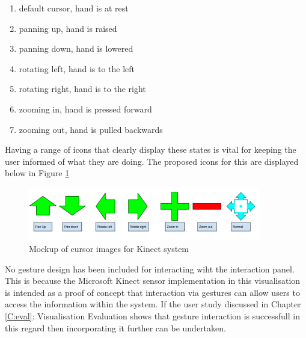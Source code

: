 \begin{enumerate}
\begin{enumerate}
 \item default cursor, hand is at rest
 \item panning up, hand is raised
 \item panning down, hand is lowered
 \item rotating left, hand is to the left
 \item rotating right, hand is to the right
 \item zooming in, hand is pressed forward
 \item zooming out, hand is pulled backwards
\end{enumerate}
Having a range of icons that clearly display these states is vital for keeping
the user informed of what they are doing. The proposed icons for this are displayed below in Figure \ref{fig:cursors}
\begin{figure}[H]
  \centering
      \includegraphics[width=0.9\textwidth]{images/curserImages.png}
  \caption{Mockup of cursor images for Kinect system}  
  \label{fig:cursors}
\end{figure}

No gesture design has been included for interacting wiht the interaction panel. This is because the Microsoft Kinect sensor implementation in this visualisation is intended as a proof of concept that interaction via gestures can allow users to access the information within the system. If the user study discussed in Chapter \ref{C:eval}: Visualisation Evaluation shows that gesture interaction is successfull in this regard then incorporating it further can be undertaken.
\end{enumerate}


